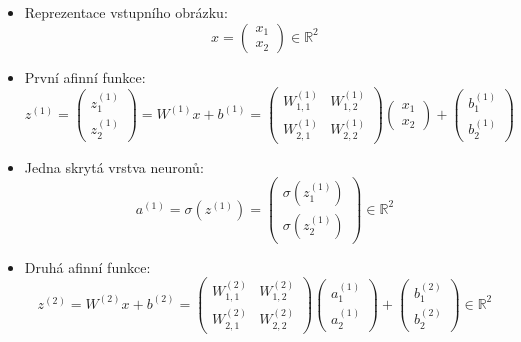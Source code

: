 \begin{itemize}

  \item  Reprezentace vstupního obrázku:
    $$x =
    \begin{pmatrix}
      x_1 \\
      x_2
    \end{pmatrix}
    \in \mathbb{R}^{2}$$

  \item  První afinní funkce:
    $$z^{(1)} =
    \begin{pmatrix}
      z^{(1)}_1 \\
      z^{(1)}_2
    \end{pmatrix}
    = W^{(1)} x + b^{(1)} =
    \begin{pmatrix}
      W^{(1)}_{1, 1} & W^{(1)}_{1, 2} \\
      W^{(1)}_{2, 1} & W^{(1)}_{2, 2} 
    \end{pmatrix}
    \begin{pmatrix}
      x_1 \\
      x_2
    \end{pmatrix}
    +
    \begin{pmatrix}
      b^{(1)}_1 \\
      b^{(1)}_2
    \end{pmatrix}
    $$

  \item  Jedna skrytá vrstva neuronů:
    $$a^{(1)} = \sigma(z^{(1)}) =
    \begin{pmatrix}
      \sigma(z^{(1)}_1) \\
      \sigma(z^{(1)}_2)
    \end{pmatrix}
    \in \mathbb{R}^{2}$$

  \item  Druhá afinní funkce:
    $$z^{(2)} = W^{(2)} x + b^{(2)} = 
    \begin{pmatrix}
      W^{(2)}_{1, 1} & W^{(2)}_{1, 2} \\
      W^{(2)}_{2, 1} & W^{(2)}_{2, 2} 
    \end{pmatrix}
    \begin{pmatrix}
      a^{(1)}_1 \\
      a^{(1)}_2
    \end{pmatrix}
    +
    \begin{pmatrix}
      b^{(2)}_1 \\
      b^{(2)}_2
    \end{pmatrix}
    \in \mathbb{R}^{2}$$


\end{itemize}
